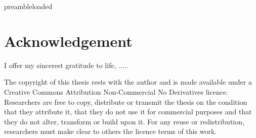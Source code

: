 \def\ifundefined#1{\expandafter\ifx\csname#1\endcsname\relax}
\ifundefined{preambleloaded}\else\typeout{\preambleloaded}\fi




\thispagestyle{empty} 

\maketitle


\thispagestyle{empty}

\newpage

\begin{abstract}

\end{abstract}


\chapter*{Acknowledgement}
I offer my sincerest gratitude to life, .....
\clearpage

\vspace*{\fill}
The copyright of this thesis rests with the author and is made available under a Creative Commons Attribution Non-Commercial No Derivatives licence. Researchers are free to copy, distribute or transmit the thesis on the condition that they attribute it, that they do not use it for commercial purposes and that they do not alter, transform or build upon it. For any reuse or redistribution, researchers must make clear to others the licence terms of this work.

\begin{center}
\end{center}


\newpage

\tableofcontents

\thispagestyle{empty}

\newpage






    



\newpage

\label{page_bibliography}
 








